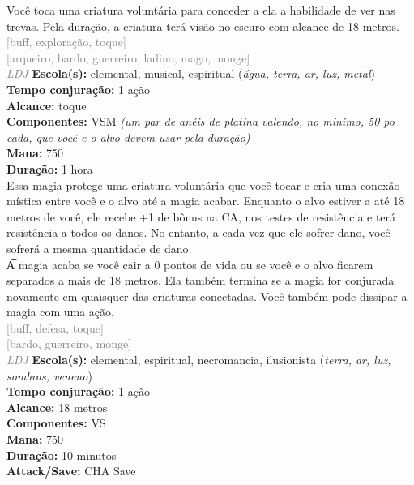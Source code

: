 \documentclass{RPG_Adventure}[2021/10/20]
\begin{document}
{\normalsize Você toca uma criatura voluntária para conceder a ela a habilidade de ver nas trevas. Pela duração, a criatura terá visão no escuro com alcance de 18 metros.\\}
{\scriptsize \textcolor{gray}{[buff, exploração, toque]\\}}
{\scriptsize \textcolor{gray}{[arqueiro, bardo, guerreiro, ladino, mago, monge]\\}}
{\tiny \textcolor{gray}{\textit{LDJ}}}
{\small \t \textbf{Escola(s):} elemental, musical, espiritual (\textit{água, terra, ar, luz, metal})\\\t \textbf{Tempo conjuração:} 1 ação\\\t \textbf{Alcance:} toque\\\t \textbf{Componentes:} VSM \textit{(um par de anéis de platina valendo, no mínimo, 50 po cada, que você e o alvo devem usar pela duração)}\\\t \textbf{Mana:} 750\\\t \textbf{Duração:} 1 hora\\}
{\normalsize Essa magia protege uma criatura voluntária que você tocar e cria uma conexão mística entre você e o alvo até a magia acabar. Enquanto o alvo estiver a até 18 metros de você, ele recebe +1 de bônus na CA, nos testes de resistência e terá resistência a todos os danos. No entanto, a cada vez que ele sofrer dano, você sofrerá a mesma quantidade de dano.\\\t A magia acaba se você cair a 0 pontos de vida ou se você e o alvo ficarem separados a mais de 18 metros. Ela também termina se a magia for conjurada novamente em quaisquer das criaturas conectadas. Você também pode dissipar a magia com uma ação.\\}
{\scriptsize \textcolor{gray}{[buff, defesa, toque]\\}}
{\scriptsize \textcolor{gray}{[bardo, guerreiro, monge]\\}}
{\tiny \textcolor{gray}{\textit{LDJ}}}
{\small \t \textbf{Escola(s):} elemental, espiritual, necromancia, ilusionista (\textit{terra, ar, luz, sombras, veneno})\\\t \textbf{Tempo conjuração:} 1 ação\\\t \textbf{Alcance:} 18 metros\\\t \textbf{Componentes:} VS\\\t \textbf{Mana:} 750\\\t \textbf{Duração:} 10 minutos\\\t \textbf{Attack/Save:} CHA Save\\}
\end{document}
